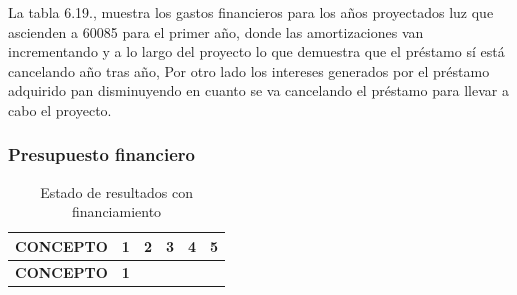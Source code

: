 \documentclass[
  stu,
  floatsintext,
  longtable,
  a4paper,
  nolmodern,
  notxfonts,
  notimes,
  colorlinks=true,linkcolor=blue,citecolor=blue,urlcolor=blue]{apa7}
\begin{document}
La tabla 6.19., muestra los gastos financieros para los años proyectados
luz que ascienden a 60085 para el primer año, donde las amortizaciones
van incrementando y a lo largo del proyecto lo que demuestra que el
préstamo sí está cancelando año tras año, Por otro lado los intereses
generados por el préstamo adquirido pan disminuyendo en cuanto se va
cancelando el préstamo para llevar a cabo el proyecto.

\subsubsection{Presupuesto financiero}\label{presupuesto-financiero}

\begin{longtable}[]{@{}
  >{\raggedright\arraybackslash}p{}
  >{\centering\arraybackslash}p{}
  >{\centering\arraybackslash}p{}
  >{\centering\arraybackslash}p{}
  >{\centering\arraybackslash}p{}
  >{\centering\arraybackslash}p{}@{}}
\caption{Estado de resultados con financiamiento}\tabularnewline
\toprule\noalign{}
\begin{minipage}[b]{\linewidth}\raggedright
\textbf{CONCEPTO}
\end{minipage} & \begin{minipage}[b]{\linewidth}\centering
\textbf{1}
\end{minipage} & \begin{minipage}[b]{\linewidth}\centering
\textbf{2}
\end{minipage} & \begin{minipage}[b]{\linewidth}\centering
\textbf{3}
\end{minipage} & \begin{minipage}[b]{\linewidth}\centering
\textbf{4}
\end{minipage} & \begin{minipage}[b]{\linewidth}\centering
\textbf{5}
\end{minipage} \\
\midrule\noalign{}
\endfirsthead
\toprule\noalign{}
\begin{minipage}[b]{\linewidth}\raggedright
\textbf{CONCEPTO}
\end{minipage} & \begin{minipage}[b]{\linewidth}\centering
\textbf{1}
\end{minipage} & \begin{minipage}[b]{\linewidth}\centering

\end{minipage}
\end{longtable}
\end{document}
